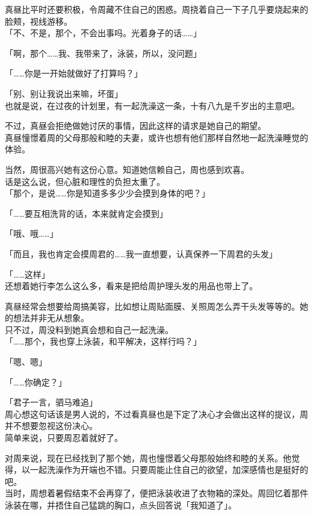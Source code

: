 真昼比平时还要积极，令周藏不住自己的困惑。周挠着自己一下子几乎要烧起来的脸颊，视线游移。\\

「不、不是，那个，不会出事吗。光着身子的话……」

「啊，那个……我、我带来了，泳装，所以，没问题」

「……你是一开始就做好了打算吗？」

「别、别让我说出来嘛，坏蛋」\\

也就是说，在过夜的计划里，有一起洗澡这一条，十有八九是千岁出的主意吧。

不过，真昼会拒绝做她讨厌的事情，因此这样的请求是她自己的期望。\\

真昼憧憬着周的父母那般和睦的夫妻，或许也想有他们那样自然地一起洗澡睡觉的体验。

当然，周很高兴她有这份心意。知道她信赖自己，周也感到欢喜。\\

话是这么说，但心脏和理性的负担太重了。\\

「那个，是说……你是知道多多少少会摸到身体的吧？」

「……要互相洗背的话，本来就肯定会摸到」

「哦、哦……」

「而且，我也肯定会摸周君的……我一直想要，认真保养一下周君的头发」

「……这样」\\

还想着她行李怎么这么多，看来是把给周护理头发的用品也带上了。

真昼经常会想要给周搞美容，比如想让周贴面膜、关照周怎么弄干头发等等的。她的想法并非无从想象。\\

只不过，周没料到她真会想和自己一起洗澡。\\

「……那个，我也穿上泳装，和平解决，这样行吗？」

「嗯、嗯」

「……你确定？」

「君子一言，驷马难追」\\

周心想这句话该是男人说的，不过看真昼也是下定了决心才会做出这样的提议，周并不想要忽视这份决心。\\

简单来说，只要周忍着就好了。

对周来说，现在已经找到了那个她，周也憧憬着父母那般始终和睦的关系。他觉得，以一起洗澡作为开端也不错。只要周能止住自己的欲望，加深感情也是挺好的吧。\\

当时，周想着暑假结束不会再穿了，便把泳装收进了衣物箱的深处。周回忆着那件泳装在哪，并捂住自己猛跳的胸口，点头回答说「我知道了」。
